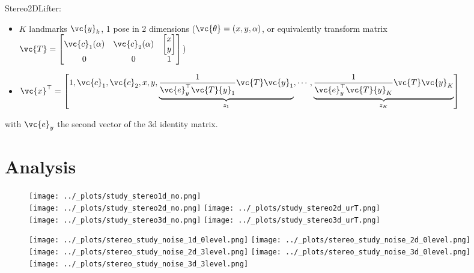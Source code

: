 Stereo2DLifter:

\begin{itemize}
\tightlist
\item \(K\) landmarks \(\vc{y}_k\), 1 pose in 2 dimensions (\(\vc{\theta}=(x, y, \alpha)\), or equivalently transform matrix \(\vc{T}=\begin{bmatrix} \vc{c}_1(\alpha) & \vc{c}_2(\alpha) & \begin{bmatrix} x \\ y \end{bmatrix} \\ 0 & 0 & 1 \end{bmatrix}\))
\item \(\vc{x}^\top = \begin{bmatrix} 1, \vc{c}_1, \vc{c}_2, x, y, \underbrace{\frac{1}{\vc{e}_y^\top\vc{T}{y}_1}\vc{T}\vc{y}_1}_{z_1}, \cdots, \underbrace{\frac{1}{\vc{e}_y^\top\vc{T}{y}_K}\vc{T}\vc{y}_K}_{z_K}\end{bmatrix}\)
\end{itemize}

with \(\vc{e}_y\) the second vector of the 3d identity matrix.

\newpage
\FloatBarrier
\section{Analysis}

\begin{figure}[h]
  \centering
  \texttt{[image: ../\_plots/study\_stereo1d\_no.png]} \\
  \texttt{[image: ../\_plots/study\_stereo2d\_no.png]} 
  \texttt{[image: ../\_plots/study\_stereo2d\_urT.png]} \\
  \texttt{[image: ../\_plots/study\_stereo3d\_no.png]} 
  \texttt{[image: ../\_plots/study\_stereo3d\_urT.png]}
  \label{fig:noise}
\end{figure}


\begin{figure}[h]
  \centering
  \texttt{[image: ../\_plots/stereo\_study\_noise\_1d\_0level.png]}
  \texttt{[image: ../\_plots/stereo\_study\_noise\_2d\_0level.png]}
  \texttt{[image: ../\_plots/stereo\_study\_noise\_2d\_3level.png]}
  \texttt{[image: ../\_plots/stereo\_study\_noise\_3d\_0level.png]}
  \texttt{[image: ../\_plots/stereo\_study\_noise\_3d\_3level.png]}
  \label{fig:noise}
\end{figure}

